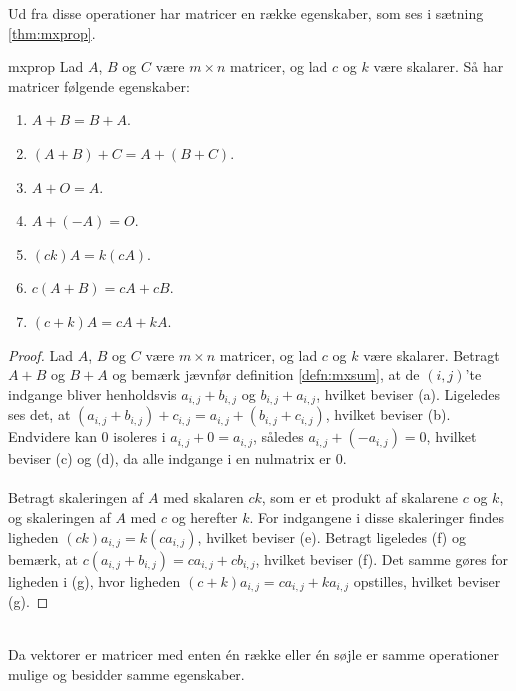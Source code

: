%
Ud fra disse operationer har matricer en række egenskaber, som ses i sætning \ref{thm:mxprop}.
\begin{thm}{}{mxprop}
Lad $A$, $B$ og $C$ være $m \times n$ matricer, og lad $c$ og $k$ være skalarer.
Så har matricer følgende egenskaber:
\begin{enumerate}[label=(\alph*)]
\item $A + B = B + A$.
\item $(A + B) + C = A + (B + C)$.
\item $A + O = A$.
\item $A + (-A) = O$.
\item $(ck)A = k(cA)$.
\item $c(A + B) = cA + cB$.
\item $(c + k)A = cA + kA$.
\end{enumerate}
\end{thm}
%
\begin{proof}
Lad $A$, $B$ og $C$ være $m \times n$ matricer, og lad $c$ og $k$ være skalarer.
Betragt $A + B$ og $B + A$ og bemærk jævnfør definition \ref{defn:mxsum}, at de $(i,j)$'te indgange bliver henholdsvis $a_{i,j} + b_{i,j}$ og $b_{i,j} + a_{i,j}$, hvilket beviser (a).
Ligeledes ses det, at $(a_{i,j} + b_{i,j}) + c_{i,j} = a_{i,j} + (b_{i,j} + c_{i,j})$, hvilket beviser (b).
Endvidere kan $0$ isoleres i $a_{i,j} + 0 = a_{i,j}$, således $a_{i,j} + (-a_{i,j}) = 0$, hvilket beviser (c) og (d), da alle indgange i en nulmatrix er $0$.
\\\\
%
Betragt skaleringen af $A$ med skalaren $ck$, som er et produkt af skalarene $c$ og $k$, og skaleringen af $A$ med $c$ og herefter $k$.
For indgangene i disse skaleringer findes ligheden $(ck)a_{i,j} = k(ca_{i,j})$, hvilket beviser (e).
Betragt ligeledes (f) og bemærk, at $c(a_{i,j} + b_{i,j}) = ca_{i,j} + cb_{i,j}$, hvilket beviser (f).
Det samme gøres for ligheden i (g), hvor ligheden $(c + k)a_{i,j} = ca_{i,j} + ka_{i,j}$ opstilles, hvilket beviser (g).
\end{proof}
\noindent
\\
%
Da vektorer er matricer med enten én række eller én søjle er samme operationer mulige og besidder samme egenskaber.
%
